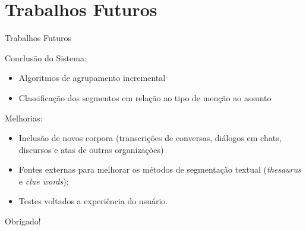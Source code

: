 \documentclass[xcolor=table]{beamer}
\begin{document}
\section{Trabalhos Futuros}
\begin{frame}{Trabalhos Futuros}
	
	\nblock{} {

		Conclusão do Sistema:
	\begin{itemize}
		\item Algoritmos de agrupamento incremental
		\item Classificação dos segmentos em relação ao tipo de menção ao assunto
	\end{itemize}
}
	
	\nblock{} {
		Melhorias:
	\begin{itemize}
		\item Inclusão de novos corpora (transcrições de conversas, diálogos em chats, discursos e atas de outras organizações)
		\item Fontes externas para melhorar os métodos de segmentação textual  (\textit{thesaurus} e \textit{clue words});
		\item Testes voltados a experiência do usuário.

	\end{itemize}
	
	}
\end{frame}



\begin{frame}{}

\center\LARGE Obrigado!

\end{frame}
\end{document}
